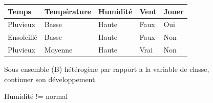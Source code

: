\documentclass[a4paper, 11pt]{report}
\begin{document}
\begin{figure}[!h]
\caption{Humidité != normal}
\label{ens6}
\begin{center}
\begin{tabular}{| l | l | l | l | l |}
\hline
\rowcolor{gray!25}
Temps & Température & Humidité & Vent & Jouer \\
\hline
Pluvieux & Basse & Haute & Faux & \cellcolor{yellow}Oui \\
\hline
Ensoleillé & Basse & Haute & Faux &  \cellcolor{green}Non \\
\hline
Pluvieux & Moyenne & Haute & Vrai &  \cellcolor{green}Non \\
\hline
\end{tabular}
\end{center}
Sous ensemble (B) hétérogène par rapport a la variable de classe, continuer son développement.
\end{figure}
\end{document}

